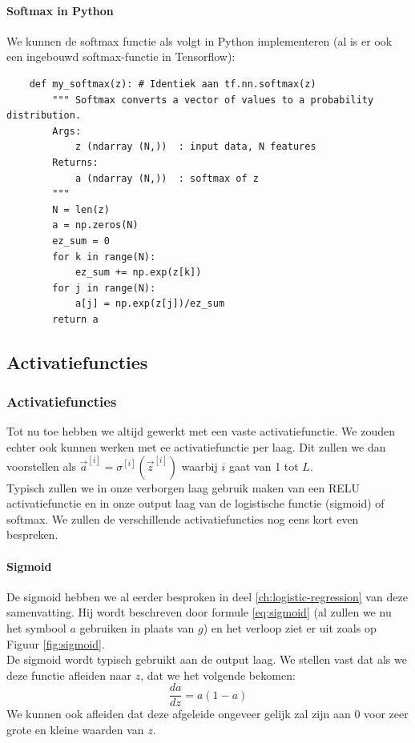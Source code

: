 \paragraph{Softmax in Python}

We kunnen de softmax functie als volgt in Python implementeren (al is er ook een ingebouwd softmax-functie in Tensorflow):

\begin{lstlisting}
	def my_softmax(z): # Identiek aan tf.nn.softmax(z)
	    """ Softmax converts a vector of values to a probability distribution.
	    Args:
	        z (ndarray (N,))  : input data, N features
	    Returns:
	        a (ndarray (N,))  : softmax of z
	    """
	    N = len(z)
	    a = np.zeros(N)
	    ez_sum = 0
	    for k in range(N):                
	        ez_sum += np.exp(z[k])       
	    for j in range(N):                
	        a[j] = np.exp(z[j])/ez_sum   
	    return a
\end{lstlisting}

\subsection{Activatiefuncties}

\subsubsection{Activatiefuncties}

Tot nu toe hebben we altijd gewerkt met een vaste activatiefunctie. We zouden echter ook kunnen werken met ee activatiefunctie per laag. Dit zullen we dan voorstellen als $\vec{a}^{[i]} = \sigma^{[i]}(\vec{z}^{[i]})$ waarbij $i$ gaat van 1 tot $L$. \\
\newline
Typisch zullen we in onze verborgen laag gebruik maken van een RELU activatiefunctie en in onze output laag van de logistische functie (sigmoid) of softmax. We zullen de verschillende activatiefuncties nog eens kort even bespreken.

\paragraph{Sigmoid}

De sigmoid hebben we al eerder besproken in deel \ref{ch:logistic-regression} van deze samenvatting. Hij wordt beschreven door formule \ref{eq:sigmoid} (al zullen we nu het symbool $a$ gebruiken in plaats van $g$) en het verloop ziet er uit zoals op Figuur \ref{fig:sigmoid}. \\
\newline
De sigmoid wordt typisch gebruikt aan de output laag. We stellen vast dat als we deze functie afleiden naar $z$, dat we het volgende bekomen:
\begin{equation}
	\frac{da}{dz} = a (1 - a)
\end{equation}
\noindent
We kunnen ook afleiden dat deze afgeleide ongeveer gelijk zal zijn aan 0 voor zeer grote en kleine waarden van $z$. 

